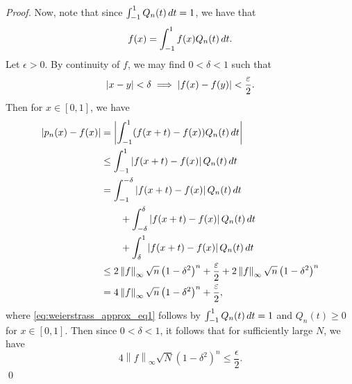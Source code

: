 \documentclass[notoc,notitlepage]{tufte-book}
\newcommand{\norm}[1]{\left\| #1 \right\|}
\begin{document}
\begin{proof}
  Now, note that since $\int_{-1}^{1} Q_n(t) \mathop{}\!d{t} = 1$, we have that
  \begin{equation*}
    f(x) = \int_{-1}^{1} f(x) Q_n(t) \mathop{}\!d{t}.
  \end{equation*}
  Let $\epsilon > 0$. By continuity of $f$, we may find $0 < \delta < 1$ such that
  \begin{equation*}
    \left| x - y \right| < \delta \implies \left| f(x) - f(y) \right| < \frac{\varepsilon}{2}.
  \end{equation*}
  Then for $x \in [0, 1]$, we have
  \begin{align}
    \abs{ p_n(x) - f(x) } &= \abs{ \int_{-1}^{1} ( f(x + t) - f(x) ) Q_n(t) \dif{t} } \nonumber \\
                          &\leq \int_{-1}^{1} \abs{ f(x + t) - f(x) } Q_n(t) \dif{t} \nonumber \\
                          &= \int_{-1}^{-\delta} \abs{ f(x + t) - f(x) } Q_n(t) \dif{t} \nonumber \\
                          &\qquad + \int_{-\delta}^{\delta} \abs{ f(x + t) - f(x) } Q_n(t) \dif{t} \nonumber \\
                          &\qquad + \int_{\delta}^{1} \abs{ f(x + t) - f(x) } Q_n(t) \dif{t} \nonumber \\
                          &\leq 2 \norm{f}_\infty \sqrt{n} \left( 1 - \delta^2 \right)^n + \frac{\epsilon}{2} + 2 \norm{f}_\infty \sqrt{n} \left( 1 - \delta^2 \right)^n \label{eq:weierstrass_approx_eq1} \\
                          &= 4 \norm{f}_\infty \sqrt{n} \left( 1 - \delta^2 \right)^n + \frac{\epsilon}{2}, \nonumber
  \end{align}
  where \cref{eq:weierstrass_approx_eq1} follows by $\int_{-1}^{1} Q_n(t) \mathop{}\!d{t} = 1$ and $Q_n(t) \geq 0$ for $x \in [0, 1]$. Then since $0 < \delta < 1$, it follows that for sufficiently large $N$, we have
  \begin{equation*}
    4 \norm{f}_\infty \sqrt{N} \left( 1 - \delta^2 \right)^n \leq \frac{\epsilon}{2}.
  \end{equation*}\qed\
\end{proof}
\end{document}
